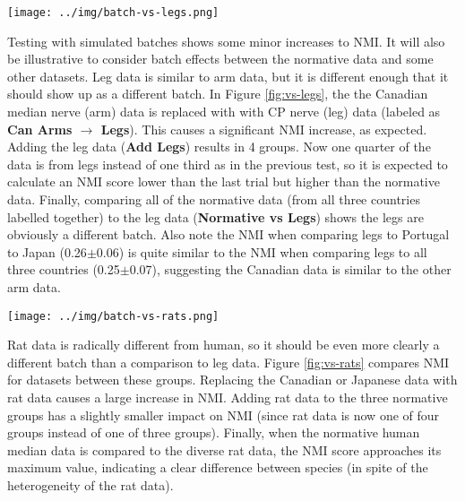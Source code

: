 \documentclass[12pt]{article}
\begin{document}
\pagebreak

\begin{figure*}
  \centering
       \texttt{[image: ../img/batch-vs-legs.png]}
         \caption{}
  \label{fig:vs-legs}
\end{figure*}

Testing with simulated batches shows some minor increases to NMI. It will also be illustrative to consider batch effects between the normative data and some other datasets. Leg data is similar to arm data, but it is different enough that it should show up as a different batch. In Figure \ref{fig:vs-legs}, the the Canadian median nerve (arm) data is replaced with with CP nerve (leg) data (labeled as \textbf{Can Arms $\rightarrow$ Legs}). This causes a significant NMI increase, as expected. Adding the leg data (\textbf{Add Legs}) results in 4 groups. Now one quarter of the data is from legs instead of one third as in the previous test, so it is expected to calculate an NMI score lower than the last trial but higher than the normative data. Finally, comparing all of the normative data (from all three countries labelled together) to the leg data (\textbf{Normative vs Legs}) shows the legs are obviously a different batch. Also note the NMI when comparing legs to Portugal to Japan (0.26$\pm$0.06) is quite similar to the NMI when comparing legs to all three countries  (0.25$\pm$0.07), suggesting the Canadian data is similar to the other arm data.

\pagebreak

\begin{figure*}
  \centering
       \texttt{[image: ../img/batch-vs-rats.png]}
         \caption{}
  \label{fig:vs-rats}
\end{figure*}

Rat data is radically different from human, so it should be even more clearly a different batch than a comparison to leg data.  Figure \ref{fig:vs-rats} compares NMI for datasets between these groups. Replacing the Canadian or Japanese data with rat data causes a large increase in NMI. Adding rat data to the three normative groups has a slightly smaller impact on NMI (since rat data is now one of four groups instead of one of three groups). Finally, when the normative human median data is compared to the diverse rat data, the NMI score approaches its maximum value, indicating a clear difference between species (in spite of the heterogeneity of the rat data).

\pagebreak
\end{document}
